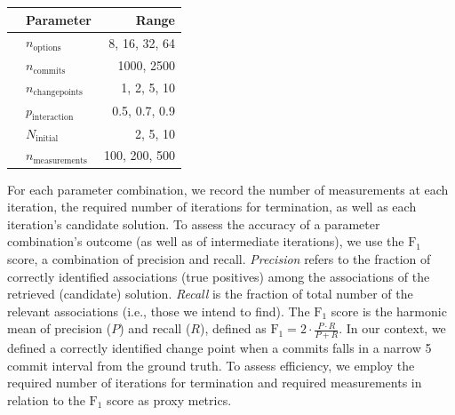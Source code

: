 \documentclass[sigconf]{acmart}
\begin{document}
	\begin{table}
		\centering
		\label{tab:synthetic_experiment_ranges}
		\begin{tabular}{llr}
			\toprule
			\textbf{}                & \textbf{Parameter}        & \multicolumn{1}{r}{\textbf{Range}} \\
			\midrule
			\parbox[t]{20mm}{} & $n_\text{options}$                & 8, 16, 32, 64                \\
			& $n_\text{commits}$                & 1000, 2500                \\
			& $n_\text{changepoints}$           & 1, 2, 5, 10                        \\
			& $p_\text{interaction}$ & 0.5, 0.7, 0.9                     \\
			\midrule
			\parbox[t]{20mm}{}   & $N_\text{initial}$       & 2, 5, 10                           \\
			& $n_\text{measurements}$           & 100, 200, 500                      \\
			\bottomrule            
		\end{tabular}
	\end{table}
	
	For each parameter combination, we record the number of measurements at each iteration, the required number of iterations for termination, as well as each iteration's candidate solution. To assess the accuracy of a parameter combination's outcome (as well as of intermediate iterations), we use the $\text{F}_1$ score, a combination of precision and recall. \emph{Precision} refers to the fraction of correctly identified associations (true positives) among the associations of the retrieved (candidate) solution. \emph{Recall} is the fraction of total number of the relevant associations (i.e., those we intend to find). The $\text{F}_1$ score is the harmonic mean of precision ($P$) and recall ($R$), defined as $\text{F}_1 = 2\cdot\frac{P \cdot R}{P + R}$.	In our context, we defined a correctly identified change point when a commits falls in a narrow 5 commit interval from the ground truth.
	{\color{red}To assess efficiency, we employ the required number of iterations for termination and required measurements in relation to the $\text{F}_1$ score as proxy metrics.}
	
\end{document}
